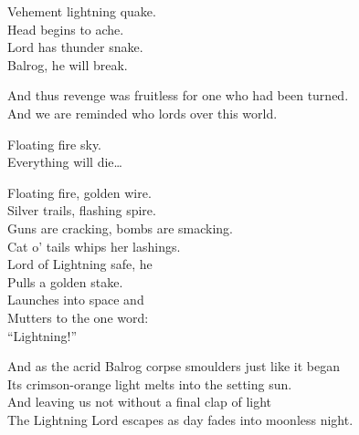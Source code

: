Vehement lightning quake. \\
Head begins to ache. \\
Lord has thunder snake. \\
Balrog, he will break. \\


And thus revenge was fruitless for one who had been turned. \\
And we are reminded who lords over this  world. \\


Floating fire sky. \\
Everything will die… \\


Floating fire, golden wire. \\
Silver trails, flashing spire. \\
Guns are cracking, bombs are smacking. \\
Cat o' tails whips her lashings. \\

Lord of Lightning safe, he \\
Pulls a golden stake. \\
Launches into space and \\
Mutters to the  one word: \\

``Lightning!'' \\





And as the acrid Balrog corpse smoulders just like it began \\
Its crimson-orange light melts into the setting sun. \\

And leaving us not without a final clap of light \\
The Lightning Lord escapes as day fades into moonless night. \\




